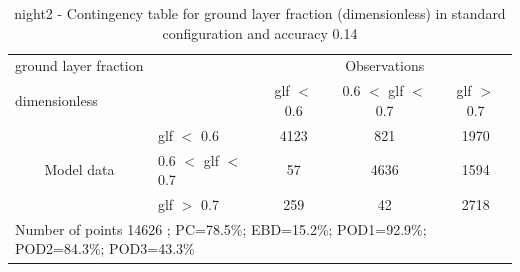 \begin{table}[p!]
\begin{center}
\begin{tabular}{llccc}
\hline
{ground layer fraction}                                       &                                                    & \multicolumn{3}{c}{Observations}                 \\
{dimensionless}                                       &                             & glf $<$ 0.6   & 0.6 $<$ glf $<$ 0.7 & glf $>$ 0.7 \\
\hline
\multicolumn{1}{c}{\multirow{3}{*}{Model data}}  & glf $<$ 0.6             & 4123                & 821                       & 1970              \\
                                                 & 0.6  $<$ glf $<$ 0.7 & 57                & 4636                       & 1594              \\
                                                 & glf $>$ 0.7             & 259                & 42                       & 2718              \\
\hline
\multicolumn{5}{l}{ Number of points        14626 ; PC=78.5\%; EBD=15.2\%; POD1=92.9\%; POD2=84.3\%; POD3=43.3\%}
\end{tabular}
\end{center}
\caption{night2 - Contingency table for  ground layer fraction (dimensionless) in standard configuration and accuracy 0.14}
\label{tab:contingencyglfBEF:night2}
\end{table}
